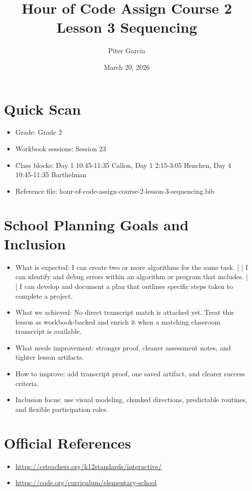 \documentclass[11pt]{article}
\title{Hour of Code Assign Course 2 Lesson 3 Sequencing}
\author{Piter Garcia}
\date{March 20, 2026}
\begin{document}
    \maketitle
    \section*{Quick Scan}
    \begin{itemize}[leftmargin=*]
    \item Grade: Grade 2
    \item Workbook sessions: Session 23
    \item Class blocks: Day 1 10:45-11:35 Callon, Day 1 2:15-3:05 Henchen, Day 4 10:45-11:35 Barthelman
    \item Reference file: hour-of-code-assign-course-2-lesson-3-sequencing.bib
    \end{itemize}
    \section*{School Planning Goals and Inclusion}
    \begin{itemize}[leftmargin=*]
    \item What is expected: I can create two or more algorithms for the same task. | | I can identify and debug errors within an algorithm or program that includes. | | I can develop and document a plan that outlines specific steps taken to complete a project.
    \item What we achieved: No direct transcript match is attached yet. Treat this lesson as workbook-backed and enrich it when a matching classroom transcript is available.
    \item What needs improvement: stronger proof, cleaner assessment notes, and tighter lesson artifacts.
    \item How to improve: add transcript proof, one saved artifact, and clearer success criteria.
    \item Inclusion focus: use visual modeling, chunked directions, predictable routines, and flexible participation roles.
    \end{itemize}
    \section*{Official References}
    \begin{itemize}[leftmargin=*]
    \item \url{https://csteachers.org/k12standards/interactive/}
\item \url{https://code.org/curriculum/elementary-school}

    \end{itemize}
    
\end{document}

